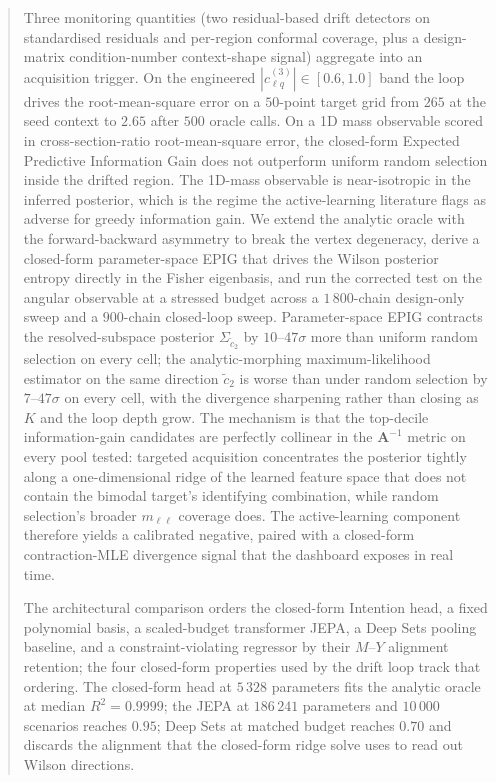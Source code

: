 \documentclass[11pt,a4paper]{article}
\newcommand{\mll}{m_{\ell\ell}}
\begin{document}
\begin{abstract}
Three monitoring quantities (two residual-based drift detectors on standardised residuals and per-region conformal coverage, plus a design-matrix condition-number context-shape signal) aggregate into an acquisition trigger. On the engineered $|c_{\ell q}^{(3)}| \in [0.6, 1.0]$ band the loop drives the root-mean-square error on a $50$-point target grid from $265$ at the seed context to $2.65$ after $500$ oracle calls. On a 1D mass observable scored in cross-section-ratio root-mean-square error, the closed-form Expected Predictive Information Gain does not outperform uniform random selection inside the drifted region. The 1D-mass observable is near-isotropic in the inferred posterior, which is the regime the active-learning literature flags as adverse for greedy information gain. We extend the analytic oracle with the forward-backward asymmetry to break the vertex degeneracy, derive a closed-form parameter-space EPIG that drives the Wilson posterior entropy directly in the Fisher eigenbasis, and run the corrected test on the angular observable at a stressed budget across a $1\,800$-chain design-only sweep and a $900$-chain closed-loop sweep. Parameter-space EPIG contracts the resolved-subspace posterior $\Sigma_{\tilde c_2}$ by $10$--$47\sigma$ more than uniform random selection on every cell; the analytic-morphing maximum-likelihood estimator on the same direction $\tilde c_2$ is worse than under random selection by $7$--$47\sigma$ on every cell, with the divergence sharpening rather than closing as $K$ and the loop depth grow. The mechanism is that the top-decile information-gain candidates are perfectly collinear in the $\bm{A}^{-1}$ metric on every pool tested: targeted acquisition concentrates the posterior tightly along a one-dimensional ridge of the learned feature space that does not contain the bimodal target's identifying combination, while random selection's broader $\mll$ coverage does. The active-learning component therefore yields a calibrated negative, paired with a closed-form contraction-MLE divergence signal that the dashboard exposes in real time.

The architectural comparison orders the closed-form Intention head, a fixed polynomial basis, a scaled-budget transformer JEPA, a Deep Sets pooling baseline, and a constraint-violating regressor by their $M$--$Y$ alignment retention; the four closed-form properties used by the drift loop track that ordering. The closed-form head at $5\,328$ parameters fits the analytic oracle at median $R^2 = 0.9999$; the JEPA at $186\,241$ parameters and $10\,000$ scenarios reaches $0.95$; Deep Sets at matched budget reaches $0.70$ and discards the alignment that the closed-form ridge solve uses to read out Wilson directions.


\end{abstract}
\end{document}
